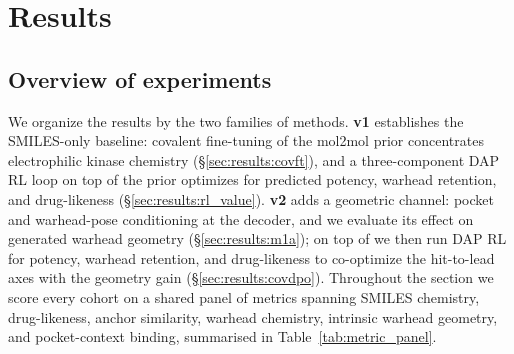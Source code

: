 \section{Results}
\label{sec:results}


\subsection*{Overview of experiments}
\label{sec:results:overview}

We organize the results by the two families of methods. \textbf{\covagen{} v1} establishes the SMILES-only baseline: covalent fine-tuning of the mol2mol prior concentrates electrophilic kinase chemistry (\S\ref{sec:results:covft}), and a three-component DAP RL loop on top of the prior optimizes for predicted potency, warhead retention, and drug-likeness (\S\ref{sec:results:rl_value}). \textbf{\covagen{} v2} adds a geometric channel: pocket and warhead-pose conditioning at the decoder, and we evaluate its effect on generated warhead geometry (\S\ref{sec:results:m1a}); on top of \Cvcond{} we then run DAP RL for potency, warhead retention, and drug-likeness to co-optimize the hit-to-lead axes with the geometry gain (\S\ref{sec:results:covdpo}). Throughout the section we score every cohort on a shared panel of metrics spanning SMILES chemistry, drug-likeness, anchor similarity, warhead chemistry, intrinsic warhead geometry, and pocket-context binding, summarised in Table~\ref{tab:metric_panel}.

